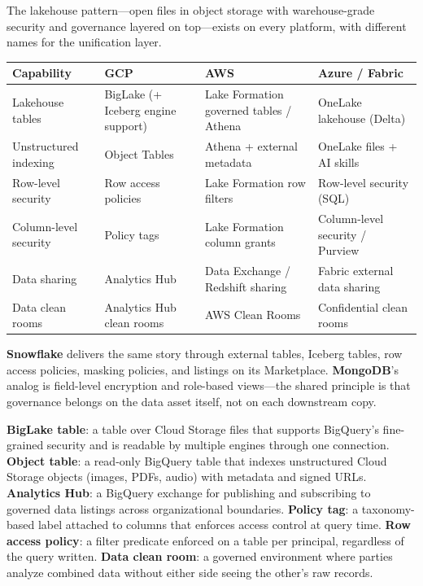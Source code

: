 \begin{crosscloud}
The lakehouse pattern---open files in object storage with warehouse-grade security and governance layered on top---exists on every platform, with different names for the unification layer.

\vspace{2mm}
{\footnotesize
\begin{tabular}{@{}p{2.8cm}p{3.0cm}p{3.0cm}p{3.0cm}@{}} \\
\toprule
\textbf{Capability} & \textbf{GCP} & \textbf{AWS} & \textbf{Azure / Fabric} \\
\midrule
Lakehouse tables & BigLake (+ Iceberg engine support) & Lake Formation governed tables / Athena & OneLake lakehouse (Delta) \\
Unstructured indexing & Object Tables & Athena + external metadata & OneLake files + AI skills \\
Row-level security & Row access policies & Lake Formation row filters & Row-level security (SQL) \\
Column-level security & Policy tags & Lake Formation column grants & Column-level security / Purview \\
Data sharing & Analytics Hub & Data Exchange / Redshift sharing & Fabric external data sharing \\
Data clean rooms & Analytics Hub clean rooms & AWS Clean Rooms & Confidential clean rooms \\
\bottomrule
\end{tabular}}

\vspace{1mm}
\textbf{Snowflake} delivers the same story through external tables, Iceberg tables, row access policies, masking policies, and listings on its Marketplace. \textbf{MongoDB}'s analog is field-level encryption and role-based views---the shared principle is that governance belongs on the data asset itself, not on each downstream copy.
\end{crosscloud}

\begin{keyterms}
\textbf{BigLake table}: a table over Cloud Storage files that supports BigQuery's fine-grained security and is readable by multiple engines through one connection.
\textbf{Object table}: a read-only BigQuery table that indexes unstructured Cloud Storage objects (images, PDFs, audio) with metadata and signed URLs.
\textbf{Analytics Hub}: a BigQuery exchange for publishing and subscribing to governed data listings across organizational boundaries.
\textbf{Policy tag}: a taxonomy-based label attached to columns that enforces access control at query time.
\textbf{Row access policy}: a filter predicate enforced on a table per principal, regardless of the query written.
\textbf{Data clean room}: a governed environment where parties analyze combined data without either side seeing the other's raw records.
\end{keyterms}

